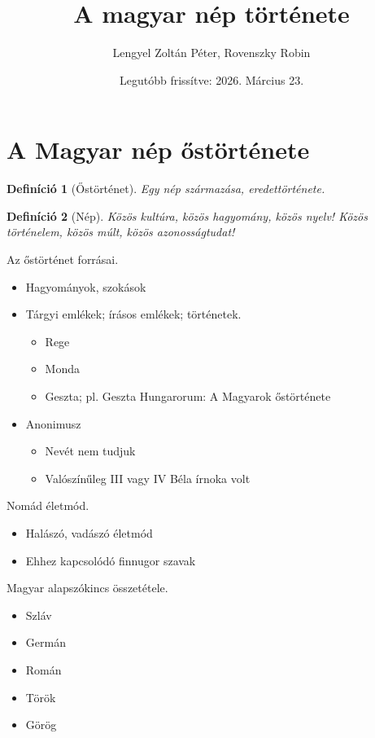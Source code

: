 \documentclass{article}
\title{A magyar nép története}
\author{Lengyel Zoltán Péter, Rovenszky Robin}
\date{Legutóbb frissítve: 2026. Március 23.}
\newtheorem{definition}{Definíció}
\begin{document}
\maketitle
\tableofcontents
\newpage

\section{A Magyar nép őstörténete}
\begin{definition}[Őstörténet]
    Egy nép származása, eredettörténete.
\end{definition}

\begin{definition}[Nép]
    Közös kultúra, közös hagyomány, közös nyelv! Közös történelem, közös múlt, közös azonosságtudat!
\end{definition}
Az őstörténet forrásai.
\begin{itemize}
    \item Hagyományok, szokások
    \item Tárgyi emlékek; írásos emlékek; történetek.
    
    \begin{itemize}
        \item Rege
        \item Monda
        \item Geszta; pl. Geszta Hungarorum: A Magyarok őstörténete
    \end{itemize}
    \item Anonimusz \begin{itemize}
    \item Nevét nem tudjuk
    \item Valószínűleg III vagy IV Béla írnoka volt 
\end{itemize}
\end{itemize}

Nomád életmód.
\begin{itemize}
    \item Halászó, vadászó életmód
    \item Ehhez kapcsolódó finnugor szavak
\end{itemize}
Magyar alapszókincs összetétele.
\begin{itemize}
    \item Szláv
    \item Germán
    \item Román
    \item Török
    \item Görög
\end{itemize}
\end{document}
